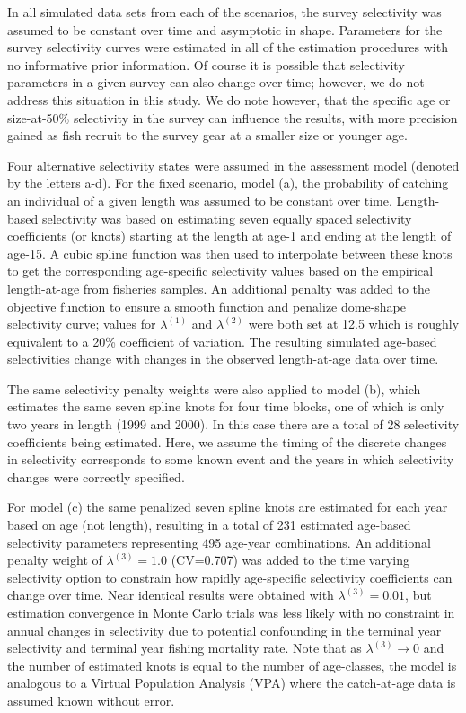 \documentclass[review,letterpaper,10pt,authoryear]{elsarticle}
\begin{document}
In all simulated data sets from each of the scenarios, the survey selectivity was assumed to be constant over time and asymptotic in shape.  Parameters for the survey selectivity curves were estimated in all of the estimation procedures with no informative prior information.  Of course it is possible that selectivity parameters in a given survey can also change over time; however, we do not address this situation in this study.  We do note however, that the specific age or size-at-50\% selectivity in the survey can influence the results, with more precision gained as fish recruit to the survey gear at a smaller size or younger age.

Four alternative selectivity states were assumed in the assessment model (denoted by the letters a-d).  For the fixed scenario, model (a), the probability of catching an individual of a given length was assumed to be constant over time.  Length-based selectivity was based on estimating seven equally spaced selectivity coefficients (or knots) starting at the length at age-1 and ending at the length of age-15.  A cubic spline function was then used to interpolate between these knots to get the corresponding age-specific selectivity values based on the empirical length-at-age from fisheries samples.  An additional penalty was added to the objective function to ensure a smooth function and penalize  dome-shape selectivity curve; values for $\lambda^{(1)}$ and $\lambda^{(2)}$ were both set at 12.5 which is roughly equivalent to a 20\% coefficient of variation.  The resulting simulated age-based selectivities change with changes in the observed length-at-age data over time.

The same selectivity penalty weights were also applied to model (b), which estimates the same seven spline knots for four time blocks, one of which is only two years in length (1999 and 2000).  In this case there are a total of 28 selectivity coefficients being estimated.  Here, we assume the timing of the discrete changes in selectivity corresponds to some known event and the years in which selectivity changes were correctly specified.  

For model (c) the same penalized seven spline knots are estimated for each year based on age (not length), resulting in a total of 231 estimated age-based selectivity parameters representing 495 age-year combinations.  An additional penalty weight of $\lambda^{(3)}=1.0$ (CV=0.707) was added to the time varying selectivity option to constrain how rapidly age-specific selectivity coefficients can change over time.  Near identical results were  obtained with $\lambda^{(3)}=0.01$, but estimation convergence in Monte Carlo trials was less likely with no constraint in annual changes in selectivity due to potential confounding in the terminal year selectivity and terminal year fishing mortality rate.  Note that as $\lambda^{(3)}\rightarrow 0$ and the number of estimated knots is equal to the number of age-classes, the model is analogous to a Virtual Population Analysis (VPA) where the catch-at-age data is assumed known without error.
\end{document}
